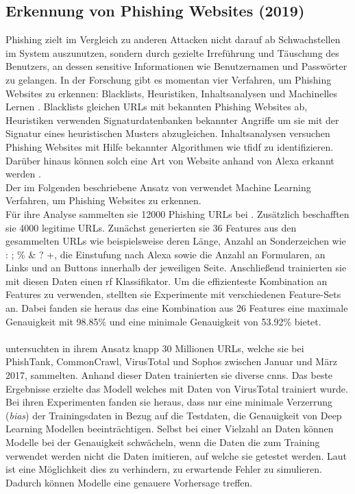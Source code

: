 \documentclass[
    12pt, %
    DIV10,
    ngerman, %
    a4paper, %
    oneside, %
    titlepage, %
    parskip=half, %
    headings=normal, %
    listof=totoc, %
    bibliography=totoc, %
    index=totoc, %
    captions=tableheading, %
    final %
]{scrreprt}
\begin{document}
\subsection{Erkennung von Phishing Websites (2019)}
Phishing zielt im Vergleich zu anderen Attacken nicht darauf ab Schwachstellen im System auszunutzen, sondern durch gezielte Irreführung und Täuschung des Benutzers, an dessen sensitive Informationen wie Benutzernamen und Passwörter zu gelangen.
In der Forschung gibt es momentan vier Verfahren, um Phishing Websites zu erkennen: Blacklists, Heuristiken, Inhaltsanalysen und Machinelles Lernen \parencite{Alswailem2019}. Blacklists gleichen URLs mit bekannten Phishing Websites ab, Heuristiken verwenden Signaturdatenbanken bekannter Angriffe um sie mit der Signatur eines heuristischen Musters abzugleichen. Inhaltsanalysen versuchen Phishing Websites mit Hilfe bekannter Algorithmen wie \ac{tfidf} zu identifizieren. Darüber hinaus können solch eine Art von Website anhand von Alexa erkannt werden \parencite{nguyen2013detecting}. \\
Der im Folgenden beschriebene Ansatz von \textcite{Alswailem2019} verwendet Machine Learning Verfahren, um Phishing Websites zu erkennen.\\
Für ihre Analyse sammelten sie 12000 Phishing URLs bei \textcite{PhishTank}. Zusätzlich beschafften sie 4000 legitime URLs. Zunächst generierten sie 36 Features aus den gesammelten URLs wie beispielsweise deren Länge, Anzahl an Sonderzeichen wie : ; \% \& ? +, die Einstufung nach Alexa sowie die Anzahl an Formularen, an Links und an Buttons innerhalb der jeweiligen Seite. Anschließend trainierten sie mit diesen Daten einen \ac{rf} Klassifikator. Um die effizienteste Kombination an Features zu verwenden, stellten sie Experimente mit verschiedenen Feature-Sets an. Dabei fanden sie heraus das eine Kombination aus 26 Features eine maximale Genauigkeit mit 98.85\% und eine minimale Genauigkeit von 53.92\% bietet. 
\\\\
\textcite{Hillary2017} untersuchten in ihrem Ansatz knapp 30 Millionen URLs, welche sie bei PhishTank, CommonCrawl, VirusTotal und Sophos zwischen Januar und März 2017, sammelten. Anhand dieser Daten trainierten sie diverse \ac{cnns}. Das beste Ergebnisse erzielte das Modell welches mit Daten von VirusTotal trainiert wurde. Bei ihren Experimenten fanden sie heraus, dass nur eine minimale Verzerrung (\emph{bias}) der Trainingsdaten in Bezug auf die Testdaten, die Genauigkeit von Deep Learning Modellen beeinträchtigen. Selbst bei einer Vielzahl an Daten können Modelle bei der Genauigkeit schwächeln, wenn die Daten die zum Training verwendet werden nicht die Daten imitieren, auf welche sie getestet werden. Laut \citeauthor{Hillary2017} ist eine Möglichkeit dies zu verhindern, zu erwartende Fehler zu simulieren. Dadurch können Modelle eine genauere Vorhersage treffen.
%
\end{document}
